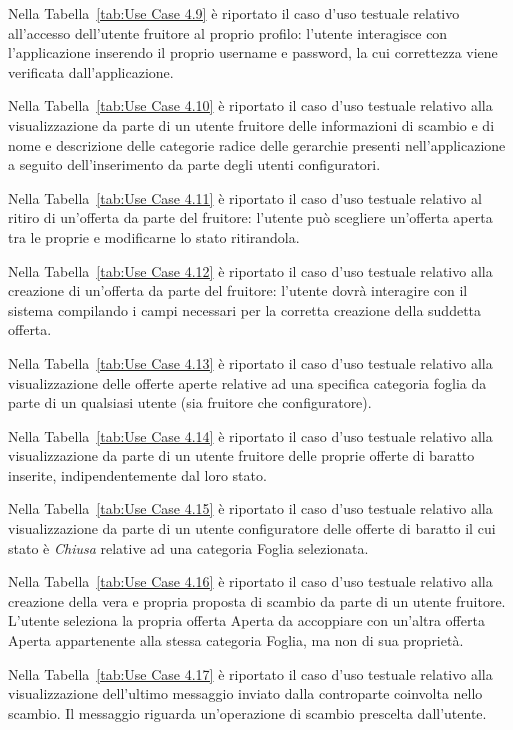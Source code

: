 Nella Tabella~\ref{tab:Use Case 4.9} è riportato il caso d'uso testuale relativo all'accesso dell'utente fruitore al proprio profilo: l'utente interagisce con l'applicazione inserendo il proprio username e password, la cui correttezza viene verificata dall'applicazione.\bigskip

Nella Tabella~\ref{tab:Use Case 4.10} è riportato il caso d'uso testuale relativo alla visualizzazione da parte di un utente fruitore delle informazioni di scambio e di nome e descrizione delle categorie radice delle gerarchie presenti nell'applicazione a seguito dell'inserimento da parte degli utenti configuratori.\bigskip

Nella Tabella~\ref{tab:Use Case 4.11} è riportato il caso d'uso testuale relativo al ritiro di un'offerta da parte del fruitore: l'utente può scegliere un'offerta aperta tra le proprie e modificarne lo stato ritirandola.\bigskip

Nella Tabella~\ref{tab:Use Case 4.12} è riportato il caso d'uso testuale relativo alla creazione di un'offerta da parte del fruitore: l'utente dovrà interagire con il sistema compilando i campi necessari per la corretta creazione della suddetta offerta.\bigskip

Nella Tabella~\ref{tab:Use Case 4.13} è riportato il caso d'uso testuale relativo alla visualizzazione delle offerte aperte relative ad una specifica categoria foglia da parte di un qualsiasi utente (sia fruitore che configuratore).\bigskip

Nella Tabella~\ref{tab:Use Case 4.14} è riportato il caso d'uso testuale relativo alla visualizzazione da parte di un utente fruitore delle proprie offerte di baratto inserite, indipendentemente dal loro stato.\bigskip

Nella Tabella~\ref{tab:Use Case 4.15} è riportato il caso d'uso testuale relativo alla visualizzazione da parte di un utente configuratore delle offerte di baratto il cui stato è \textit{Chiusa} relative ad una categoria Foglia selezionata.\bigskip

Nella Tabella~\ref{tab:Use Case 4.16} è riportato il caso d'uso testuale relativo alla creazione della vera e propria proposta di scambio da parte di un utente fruitore. L'utente seleziona la propria offerta Aperta da accoppiare con un'altra offerta Aperta appartenente alla stessa categoria Foglia, ma non di sua proprietà.\bigskip

Nella Tabella~\ref{tab:Use Case 4.17} è riportato il caso d'uso testuale relativo alla visualizzazione dell'ultimo messaggio inviato dalla controparte coinvolta nello scambio. Il messaggio riguarda un'operazione di scambio prescelta dall'utente.\bigskip

